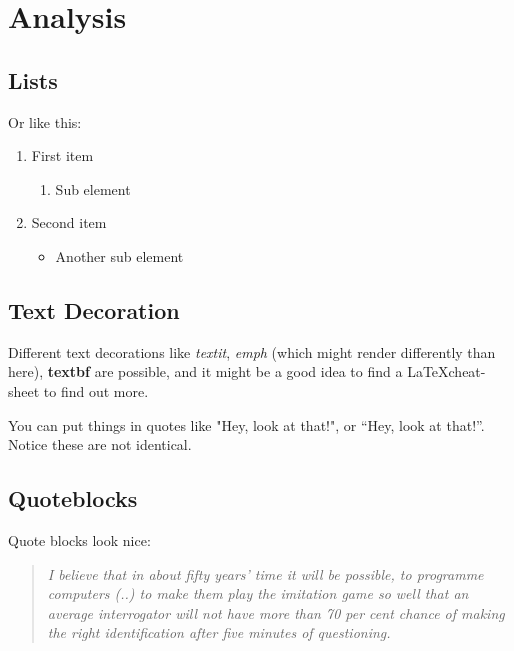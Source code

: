 \documentclass[a4paper, twocolumn]{article}
\begin{document}
\section{Analysis}



\subsection{Lists}
\label{sec:Lists}



Or like this:

\begin{enumerate}
    \item First item
        \begin{enumerate}
            \item Sub element
        \end{enumerate}
    \item Second item
        \begin{itemize}
            \item Another sub element
        \end{itemize}
\end{enumerate}


\subsection{Text Decoration\label{sec:Text Decoration}}


Different text decorations like \textit{textit}, \emph{emph} (which might render differently than here), \textbf{textbf} are possible, and it might be a good idea to find a \LaTeX cheat-sheet to find out more.

You can put things in quotes like "Hey, look at that!", or ``Hey, look at that!''.
Notice these are not identical.


\subsection{Quoteblocks\label{sec:Quoteblock}}

Quote blocks look nice:

\begin{quote}
\emph{
I believe that in about fifty years' time it will be possible, to programme computers (..) to make them play the imitation game so well that an average interrogator will not have more than 70 per cent chance of making the right identification after five minutes of questioning.
}
\cite{turing1950computing}
\end{quote}
\end{document}

